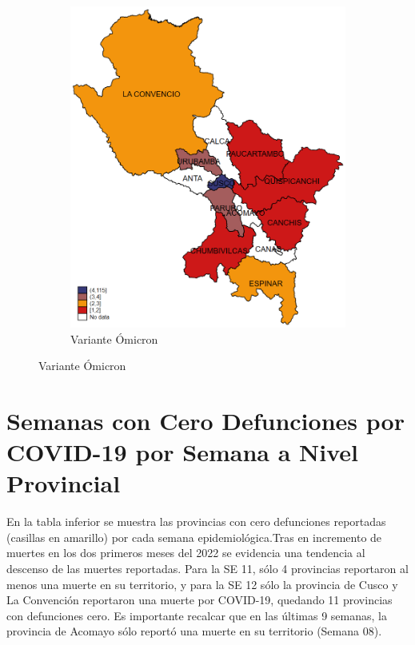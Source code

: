 \documentclass[12pt,a4paper,openany]{book}
\begin{document}
\begin{figure}[h]
\begin{subfigure}[b]{0.40\textwidth}
				\includegraphics[width=\textwidth]{../figuras/variantes_provincial_omicron.png}
				\caption{Variante Ómicron}
			\end{subfigure}
			\end{figure}

\clearpage


\clearpage
	\section*{Semanas con Cero Defunciones por COVID-19 por Semana a Nivel Provincial}
	
\noindent En la tabla inferior se muestra las provincias con cero defunciones reportadas (casillas en amarillo) por cada semana epidemiológica.Tras en incremento de muertes en los dos primeros meses del 2022 se evidencia una tendencia al descenso de las muertes reportadas.  Para la SE 11, sólo 4 provincias reportaron al menos una  muerte en su territorio, y para la SE 12 sólo la provincia de Cusco y La Convención reportaron una muerte por COVID-19, quedando 11 provincias con defunciones cero. Es importante recalcar que en las últimas 9 semanas, la provincia de Acomayo sólo reportó una muerte en su territorio (Semana 08). 
  
\end{document}
